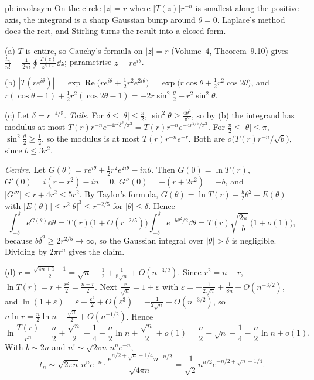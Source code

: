 \begin{solution}{pb:involasym}
\idea On the circle $|z|=r$ where $|T(z)|r^{-n}$ is smallest along the positive axis, the integrand is a sharp Gaussian bump around $\theta=0$. Laplace's method
does the rest, and Stirling turns the result into a closed form.

\writeup (a) $T$ is entire, so Cauchy's formula on $|z|=r$ (Volume~4, Theorem~9.10) gives $\frac{t_n}{n!}=\frac1{2\pi i}\oint\frac{T(z)}{z^{n+1}}\dd z$; parametrise $z=re^{i\theta}$.

(b) $|T(re^{i\theta})|=\exp\operatorname{Re}\bigl(re^{i\theta}+\frac12r^2e^{2i\theta}\bigr)=\exp\bigl(r\cos\theta+\frac12r^2\cos2\theta\bigr)$, and
$r(\cos\theta-1)+\frac12r^2(\cos2\theta-1)=-2r\sin^2\frac\theta2-r^2\sin^2\theta$.

(c) Let $\delta=r^{-4/5}$. \emph{Tails.} For $\delta\le|\theta|\le\frac\pi2$, $\sin^2\theta\ge\frac{4\theta^2}{\pi^2}$, so by (b) the integrand has modulus at most
$T(r)r^{-n}e^{-4r^2\delta^2/\pi^2}=T(r)r^{-n}e^{-4r^{2/5}/\pi^2}$. For $\frac\pi2\le|\theta|\le\pi$, $\sin^2\frac\theta2\ge\frac12$, so the modulus is at most $T(r)r^{-n}e^{-r}$. Both are
$o\bigl(T(r)r^{-n}/\sqrt b\bigr)$, since $b\le3r^2$.

\emph{Centre.} Let $G(\theta)=re^{i\theta}+\frac12r^2e^{2i\theta}-in\theta$. Then $G(0)=\ln T(r)$, $G'(0)=i(r+r^2)-in=0$, $G''(0)=-(r+2r^2)=-b$, and $|G'''|\le r+4r^2\le5r^2$. By Taylor's formula,
$G(\theta)=\ln T(r)-\frac b2\theta^2+E(\theta)$ with $|E(\theta)|\le r^2|\theta|^3\le r^{-2/5}$ for $|\theta|\le\delta$. Hence
\[
\int_{-\delta}^\delta e^{G(\theta)}\dd\theta=T(r)\bigl(1+O(r^{-2/5})\bigr)\int_{-\delta}^\delta e^{-b\theta^2/2}\dd\theta=T(r)\sqrt{\frac{2\pi}b}\,\bigl(1+o(1)\bigr),
\]
because $b\delta^2\ge2r^{2/5}\to\infty$, so the Gaussian integral over $|\theta|>\delta$ is negligible. Dividing by $2\pi r^n$ gives the claim.

(d) $r=\frac{\sqrt{4n+1}-1}2=\sqrt n-\frac12+\frac1{8\sqrt n}+O(n^{-3/2})$. Since $r^2=n-r$, $\ln T(r)=r+\frac{r^2}2=\frac{n+r}2$. Next $\frac r{\sqrt n}=1+\varepsilon$ with
$\varepsilon=-\frac1{2\sqrt n}+\frac1{8n}+O(n^{-3/2})$, and $\ln(1+\varepsilon)=\varepsilon-\frac{\varepsilon^2}2+O(\varepsilon^3)=-\frac1{2\sqrt n}+O(n^{-3/2})$, so $n\ln r=\frac n2\ln n-\frac{\sqrt n}2+O(n^{-1/2})$. Hence
\[
\ln\frac{T(r)}{r^n}=\frac n2+\frac{\sqrt n}2-\frac14-\frac n2\ln n+\frac{\sqrt n}2+o(1)=\frac n2+\sqrt n-\frac14-\frac n2\ln n+o(1).
\]
With $b\sim2n$ and $n!\sim\sqrt{2\pi n}\,n^ne^{-n}$,
\[
t_n\sim\sqrt{2\pi n}\,n^ne^{-n}\cdot\frac{e^{n/2+\sqrt n-1/4}n^{-n/2}}{\sqrt{4\pi n}}=\frac1{\sqrt2}n^{n/2}e^{-n/2+\sqrt n-1/4}.
\]


\end{solution}
